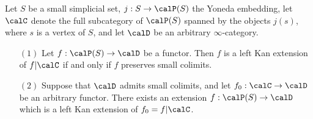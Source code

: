 \begin{lemma}\label{longwait1}
Let $S$ be a small simplicial set, $j: S \rightarrow \calP(S)$ the Yoneda embedding,
let $\calC$ denote the full subcategory of $\calP(S)$ spanned by the objects $j(s)$, where
$s$ is a vertex of $S$, and let $\calD$ be an arbitrary $\infty$-category.

\begin{itemize}
\item[$(1)$] Let $f: \calP(S) \rightarrow \calD$ be a functor. Then $f$ is a left Kan extension of $f|\calC$ if and only if $f$ preserves small colimits.
\item[$(2)$] Suppose that $\calD$ admits small colimits, and let $f_0: \calC \rightarrow \calD$
be an arbitrary functor. There exists an extension $f: \calP(S) \rightarrow \calD$ which is a left Kan extension of $f_0 = f|\calC$.
\end{itemize}
\end{lemma}

